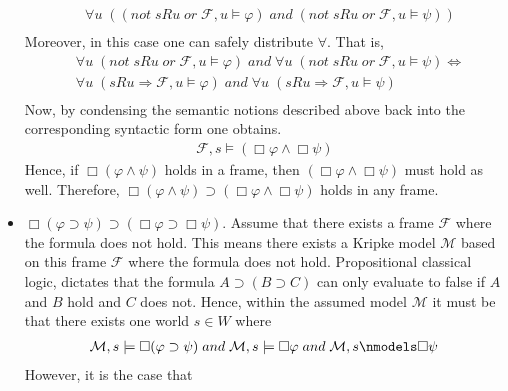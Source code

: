 \documentclass[11pt,a4paper]{article}
\newcommand{\lto}{\supset}
\newcommand{\all}{\Box}
\newcommand{\sand}{\; and \;}
\newcommand{\sor}{ \; or \;}
\newcommand{\sneg}{not \;}
\newcommand{\sto}{\Rightarrow}
\begin{document}
\begin{itemize}
\begin{equation*}
\begin{split}
&\forall u \; (( \sneg sRu \sor \mathcal{F},u \models \varphi) \sand ( \sneg sRu \sor \mathcal{F},u \models \psi))  \\
\end{split}
\end{equation*}
Moreover, in this case one can safely distribute $\forall$. That is,
\begin{equation*}
\begin{split}
&\forall u \; ( \sneg sRu \sor \mathcal{F},u \models \varphi) \sand \forall u \; ( \sneg sRu \sor \mathcal{F},u \models \psi)  \iff \\
&\forall u \; (  sRu \sto \mathcal{F},u \models \varphi) \sand \forall u \; ( sRu \sto \mathcal{F},u \models \psi)  \\
\end{split}
\end{equation*}
Now, by condensing the semantic notions described above back into the corresponding syntactic form one obtains.
\begin{equation*}
\begin{split}
\mathcal{F},s \models (\all \varphi \land \all \psi)
\end{split}
\end{equation*}
Hence, if $\all (\varphi \land \psi)$ holds in a frame, then $(\all \varphi \land \all \psi)$ must hold as well. Therefore, $\all (\varphi \land \psi) \lto (\all \varphi \land \all \psi)$ holds in any frame.
\item $\all (\varphi \lto \psi) \lto (\all \varphi \lto \all \psi)$. Assume that there exists a frame $\mathcal{F}$ where the formula does not hold. This means there exists a Kripke model $\mathcal{M}$ based on this frame $\mathcal{F}$ where the formula does not hold.
Propositional classical logic, dictates that the formula $A \lto (B \lto C)$ can only evaluate to false if $A$ and $B$ hold and $C$ does not. Hence, within the assumed model $\mathcal{M}$ it must be that there exists one world $s \in W$ where
\begin{equation*}
\begin{split}
\mathcal{M},s \models \all (\varphi \lto \psi) \sand \mathcal{M},s \models \all \varphi \sand \mathcal{M},s \nmodels \all \psi
\end{split}
\end{equation*}
However, it is the case that 
\begin{equation*}
\begin{split}

\end{split}
\end{equation*}
\end{itemize}
\end{document}
